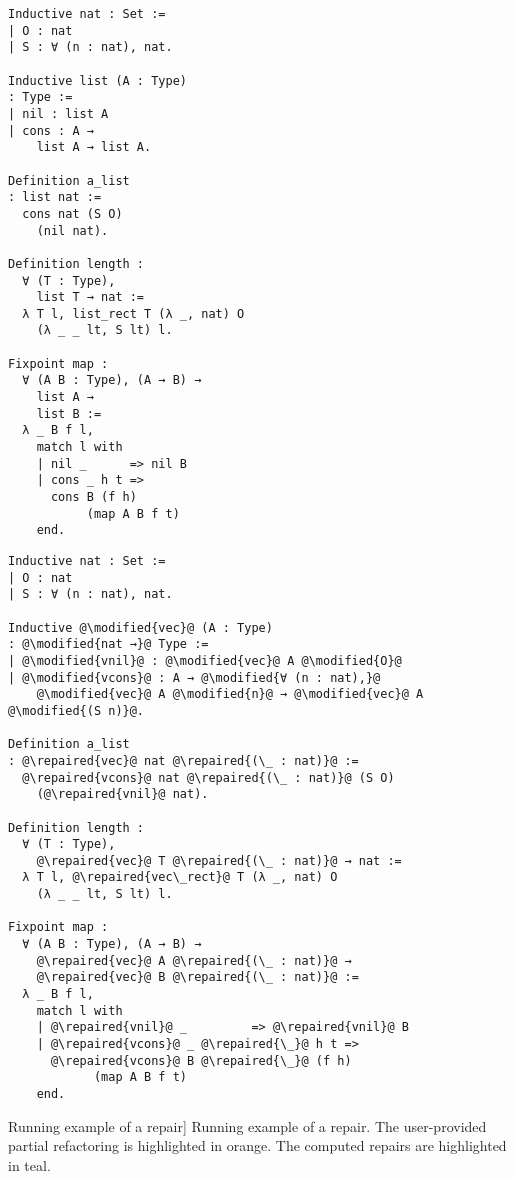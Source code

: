 \begin{figure*}[!htp]

  \noindent%
  \begin{minipage}[t]{0.50\textwidth}
    \begin{verbatim}
Inductive nat : Set :=
| O : nat
| S : ∀ (n : nat), nat.

Inductive list (A : Type)
: Type :=
| nil : list A
| cons : A →
    list A → list A.

Definition a_list
: list nat :=
  cons nat (S O)
    (nil nat).

Definition length :
  ∀ (T : Type),
    list T → nat :=
  λ T l, list_rect T (λ _, nat) O
    (λ _ _ lt, S lt) l.

Fixpoint map :
  ∀ (A B : Type), (A → B) →
    list A →
    list B :=
  λ _ B f l,
    match l with
    | nil _      => nil B
    | cons _ h t =>
      cons B (f h)
           (map A B f t)
    end.
  \end{verbatim}
\end{minipage}%
\begin{minipage}[t]{0.50\textwidth}
  \begin{verbatim}
Inductive nat : Set :=
| O : nat
| S : ∀ (n : nat), nat.

Inductive @\modified{vec}@ (A : Type)
: @\modified{nat →}@ Type :=
| @\modified{vnil}@ : @\modified{vec}@ A @\modified{O}@
| @\modified{vcons}@ : A → @\modified{∀ (n : nat),}@
    @\modified{vec}@ A @\modified{n}@ → @\modified{vec}@ A @\modified{(S n)}@.

Definition a_list
: @\repaired{vec}@ nat @\repaired{(\_ : nat)}@ :=
  @\repaired{vcons}@ nat @\repaired{(\_ : nat)}@ (S O)
    (@\repaired{vnil}@ nat).

Definition length :
  ∀ (T : Type),
    @\repaired{vec}@ T @\repaired{(\_ : nat)}@ → nat :=
  λ T l, @\repaired{vec\_rect}@ T (λ _, nat) O
    (λ _ _ lt, S lt) l.

Fixpoint map :
  ∀ (A B : Type), (A → B) →
    @\repaired{vec}@ A @\repaired{(\_ : nat)}@ →
    @\repaired{vec}@ B @\repaired{(\_ : nat)}@ :=
  λ _ B f l,
    match l with
    | @\repaired{vnil}@ _         => @\repaired{vnil}@ B
    | @\repaired{vcons}@ _ @\repaired{\_}@ h t =>
      @\repaired{vcons}@ B @\repaired{\_}@ (f h)
            (map A B f t)
    end.
  \end{verbatim}
\end{minipage}

\caption%
[Running example of a \Chick{} repair]
{Running example of a \Chick{} repair.  The user-provided partial refactoring is highlighted in orange.  The computed repairs are highlighted in teal.}~\label{listtovec}

\end{figure*}

